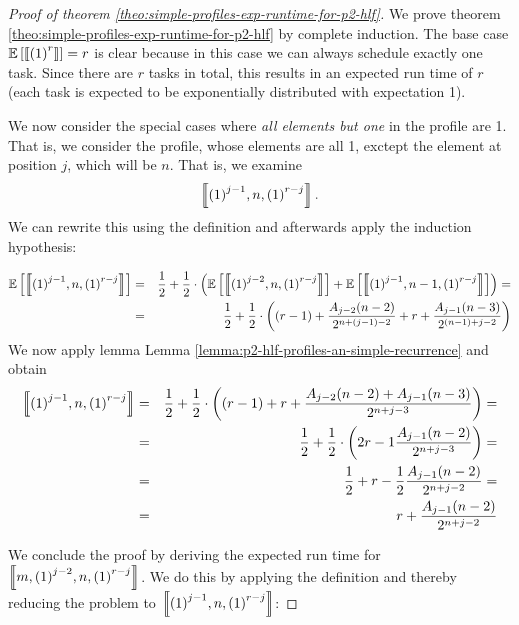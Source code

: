\begin{proof}[Proof of theorem \ref{theo:simple-profiles-exp-runtime-for-p2-hlf}]
  We prove theorem \ref{theo:simple-profiles-exp-runtime-for-p2-hlf} by complete induction. The base case $\mathbb{E}\left[ \left\llbracket {(1)}^{r} \right\rrbracket \right] = r$ is clear because in this case we can always schedule exactly one task. Since there are $r$ tasks in total, this results in an expected run time of $r$ (each task is expected to be exponentially distributed with expectation 1).

  We now consider the special cases where \emph{all elements but one} in the profile are 1. That is, we consider the profile, whose elements are all 1, exctept the element at position $j$, which will be $n$. That is, we examine
  \begin{equation*}
    \left\llbracket {(1)}^{j-1},n,{(1)}^{r-j} \right\rrbracket.
  \end{equation*}
  We can rewrite this using the definition and afterwards apply the induction hypothesis:

  \begin{eqnarray*}
    \mathbb{E}\left[ \left\llbracket {(1)}^{j-1},n,{(1)}^{r-j} \right\rrbracket \right]
    & = & 
    \frac{1}{2} + \frac{1}{2} \cdot 
    \left( 
      \mathbb{E}\left[ \left\llbracket {(1)}^{j-2},n,{(1)}^{r-j} \right\rrbracket \right] + 
      \mathbb{E}\left[ \left\llbracket {(1)}^{j-1},n-1,{(1)}^{r-j} \right\rrbracket \right]
    \right) = \\
    & = & 
    \frac{1}{2} + \frac{1}{2} \cdot 
    \left( 
      (r-1) + \frac{A_{j-2}(n-2)}{2^{n+(j-1)-2}} +
      r + \frac{A_{j-1}(n-3)}{2^{(n-1)+j-2}}
    \right)
  \end{eqnarray*}
  We now apply lemma Lemma \ref{lemma:p2-hlf-profiles-an-simple-recurrence} and obtain
  \begin{eqnarray*}
    \left\llbracket {(1)}^{j-1},n,{(1)}^{r-j} \right\rrbracket
    & = & 
    \frac{1}{2} + \frac{1}{2} \cdot 
    \left( 
      (r-1)+r + 
      \frac{A_{j-2}(n-2) + A_{j-1}(n-3)}{2^{n+j-3}}
    \right) = \\
    & = &
    \frac{1}{2} + \frac{1}{2} \cdot 
    \left( 
      2r - 1
      \frac{A_{j-1}(n-2)}{2^{n+j-3}}
    \right) = \\
    & = &
    \frac{1}{2} + 
    r - \frac{1}{2}
    \frac{A_{j-1}(n-2)}{2^{n+j-2}} = \\
    & = &
    r + \frac{A_{j-1}(n-2)}{2^{n+j-2}}
  \end{eqnarray*}

  We conclude the proof by deriving the expected run time for $\left\llbracket m,{(1)}^{j-2},n,{(1)}^{r-j} \right\rrbracket$. We do this by applying the definition and thereby reducing the problem to $\left\llbracket {(1)}^{j-1},n,{(1)}^{r-j} \right\rrbracket$:


\end{proof}
